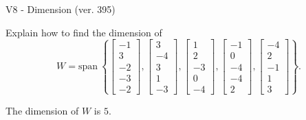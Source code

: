 \begin{exercise}
  \begin{exerciseTitle}V8 - Dimension (ver. 395)\end{exerciseTitle}
  \begin{exerciseStatement}
    Explain how to find the dimension of 
\[W=\mathrm{span}\ \left\{\left[\begin{array}{r}
-1 \\
3 \\
-2 \\
-3 \\
-2
\end{array}\right] , \left[\begin{array}{r}
3 \\
-4 \\
3 \\
1 \\
-3
\end{array}\right] , \left[\begin{array}{r}
1 \\
2 \\
-3 \\
0 \\
-4
\end{array}\right] , \left[\begin{array}{r}
-1 \\
0 \\
-4 \\
-4 \\
2
\end{array}\right] , \left[\begin{array}{r}
-4 \\
2 \\
-1 \\
1 \\
3
\end{array}\right]\right\}.\]



  \end{exerciseStatement}
  \begin{exerciseAnswer}
   The dimension of \(W\) is  \(5\).
  


  \end{exerciseAnswer}
\end{exercise}